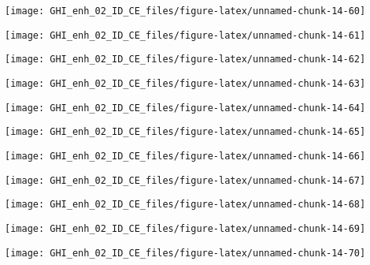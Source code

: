 \documentclass[
  10pt,
  a4paper,oneside]{article}
\begin{document}
\begin{center}\texttt{[image: GHI\_enh\_02\_ID\_CE\_files/figure-latex/unnamed-chunk-14-60]} \end{center}

\begin{center}\texttt{[image: GHI\_enh\_02\_ID\_CE\_files/figure-latex/unnamed-chunk-14-61]} \end{center}

\begin{center}\texttt{[image: GHI\_enh\_02\_ID\_CE\_files/figure-latex/unnamed-chunk-14-62]} \end{center}

\begin{center}\texttt{[image: GHI\_enh\_02\_ID\_CE\_files/figure-latex/unnamed-chunk-14-63]} \end{center}

\begin{center}\texttt{[image: GHI\_enh\_02\_ID\_CE\_files/figure-latex/unnamed-chunk-14-64]} \end{center}

\begin{center}\texttt{[image: GHI\_enh\_02\_ID\_CE\_files/figure-latex/unnamed-chunk-14-65]} \end{center}

\begin{center}\texttt{[image: GHI\_enh\_02\_ID\_CE\_files/figure-latex/unnamed-chunk-14-66]} \end{center}

\begin{center}\texttt{[image: GHI\_enh\_02\_ID\_CE\_files/figure-latex/unnamed-chunk-14-67]} \end{center}

\begin{center}\texttt{[image: GHI\_enh\_02\_ID\_CE\_files/figure-latex/unnamed-chunk-14-68]} \end{center}

\begin{center}\texttt{[image: GHI\_enh\_02\_ID\_CE\_files/figure-latex/unnamed-chunk-14-69]} \end{center}

\begin{center}\texttt{[image: GHI\_enh\_02\_ID\_CE\_files/figure-latex/unnamed-chunk-14-70]} \end{center}
\end{document}
